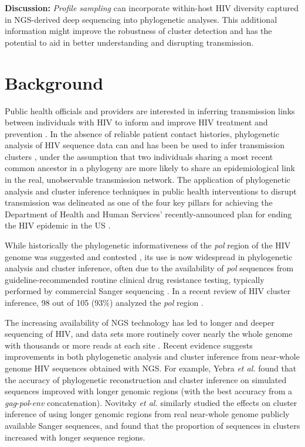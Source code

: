 \documentclass[letterpaper]{article}
\begin{document}
\textbf{Discussion:} \emph{Profile sampling} can incorporate within-host HIV diversity captured in NGS-derived deep sequencing into phylogenetic analyses. This additional information might improve the robustness of cluster detection and has the potential to aid in better understanding and disrupting transmission.

\section*{Background}

Public health officials and providers are interested in inferring transmission links between individuals with HIV to inform and improve HIV treatment and prevention \parencite{}. In the absence of reliable patient contact histories, phylogenetic analysis of HIV sequence data can and has been be used to infer transmission clusters \parencite{leitner}, under the assumption that two individuals sharing a most recent common ancestor in a phylogeny are more likely to share an epidemiological link in the real, unobservable transmission network. The application of phylogenetic analysis and cluster inference techniques in public health interventions to disrupt transmission was delineated as one of the four key pillars for achieving the Department of Health and Human Services' recently-announced plan for ending the HIV epidemic in the US \parencite{fauci}.

While historically the phylogenetic informativeness of the \emph{pol} region of the HIV genome was suggested and contested \parencite{hue, sturmer}, its use is now widespread in phylogenetic analysis and cluster inference, often due to the availability of \emph{pol} sequences from guideline-recommended routine clinical drug resistance testing, typically performed by commercial Sanger sequencing \parencite{dhhs}. In a recent review of HIV cluster inference, 98 out of 105 (93\%) analyzed the \emph{pol} region \parencite{hassan}.

The increasing availability of NGS technology has led to longer and deeper sequencing of HIV, and data sets more routinely cover nearly the whole genome with thousands or more reads at each site \parencite{voelkerding}. Recent evidence suggests improvements in both phylogenetic analysis and cluster inference from near-whole genome HIV sequences obtained with NGS. For example, Yebra \emph{et al.} \parencite{yebra} found that the accuracy of phylogenetic reconstruction and cluster inference on simulated sequences improved with longer genomic regions (with the best accuracy from a \emph{gag}-\emph{pol}-\emph{env} concatenation). Novitsky \emph{et al.} \parencite{novitsky} similarly studied the effects on cluster inference of using longer genomic regions from real near-whole genome publicly available Sanger sequences, and found that the proportion of sequences in clusters increased with longer sequence regions.
\end{document}
